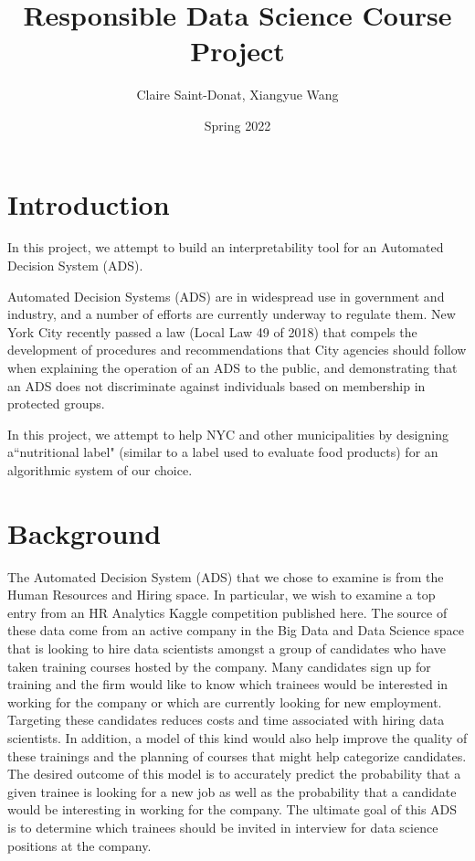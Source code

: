 \documentclass[11pt]{article}
\title{Responsible Data Science Course Project}
\author{Claire Saint-Donat, Xiangyue Wang}
\affil{Center for Data Science, New York University}
\date{Spring 2022}
\begin{document}
\maketitle
\tableofcontents

\section{Introduction}

In this project, we attempt to build an interpretability tool for an Automated Decision System (ADS). 

Automated Decision Systems (ADS) are in widespread use in government and industry, and a number of efforts are currently underway to regulate them.  New York City recently passed a law (Local Law 49 of 2018) that compels the development of procedures and recommendations that City agencies should follow when explaining the operation of an ADS to the public, and demonstrating that an ADS does not discriminate against individuals based on membership in protected groups.  

In this project, we attempt to help NYC and other municipalities by designing a``nutritional label" (similar to a label used to evaluate food products) for an algorithmic system of our choice. 
\pagebreak

\section{Background}
The Automated Decision System (ADS) that we chose to examine is from the Human Resources and Hiring space.  In particular, we wish to examine a top entry from an HR Analytics Kaggle competition published here.  The source of these data come from an active company in the Big Data and Data Science space that is looking to hire data scientists amongst a group of candidates who have taken training courses hosted by the company.  Many candidates sign up for training and the firm would like to know which trainees would be interested in working for the company or which are currently looking for new employment.  Targeting these candidates reduces costs and time associated with hiring data scientists.  In addition, a model of this kind would also help improve the quality of these trainings and the planning of courses that might help categorize candidates.  The desired outcome of this model is to accurately predict the probability that a given trainee is looking for a new job as well as the probability that a candidate would be interesting in working for the company.  The ultimate goal of this ADS is to determine which trainees should be invited in interview for data science positions at the company.
\end{document}
